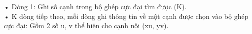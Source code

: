 • Dòng 1: Ghi số cạnh trong bộ ghép cực đại tìm được (K).   
\\   • K dòng tiếp theo, mỗi dòng ghi thông tin về một cạnh được chọn vào bộ ghép cực đại: Gồm 2 số u, v thể hiện cho cạnh nối (xu, yv).  

\